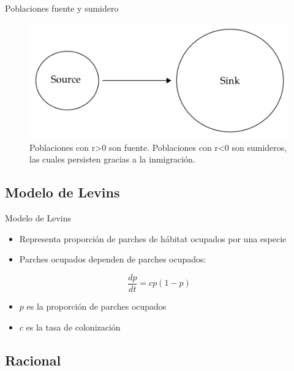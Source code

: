 \documentclass[
  11pt,
  ignorenonframetext,
]{beamer}
\begin{document}
\begin{frame}{Poblaciones fuente y sumidero}
\begin{figure}

{\centering \includegraphics{Metapoblaciones/Fuente-sumidero} 

}

\caption{Poblaciones con r>0 son fuente. Poblaciones con r<0 son sumideros, las cuales persisten gracias a la inmigración.}\label{fig:unnamed-chunk-5}
\end{figure}
\end{frame}

\hypertarget{modelo-de-levins}{%
\subsection{Modelo de Levins}\label{modelo-de-levins}}

\begin{frame}{Modelo de Levins}
\begin{itemize}
\item
  Representa proporción de parches de hábitat ocupados por una especie
\item
  Parches ocupados dependen de parches ocupados:
\end{itemize}

\[\frac{dp}{dt} = cp(1-p)\]

\begin{itemize}
\item
  \(p\) es la proporción de parches ocupados
\item
  \(c\) es la tasa de colonización
\end{itemize}
\end{frame}

\hypertarget{racional}{%
\subsection{Racional}\label{racional}}
\end{document}
